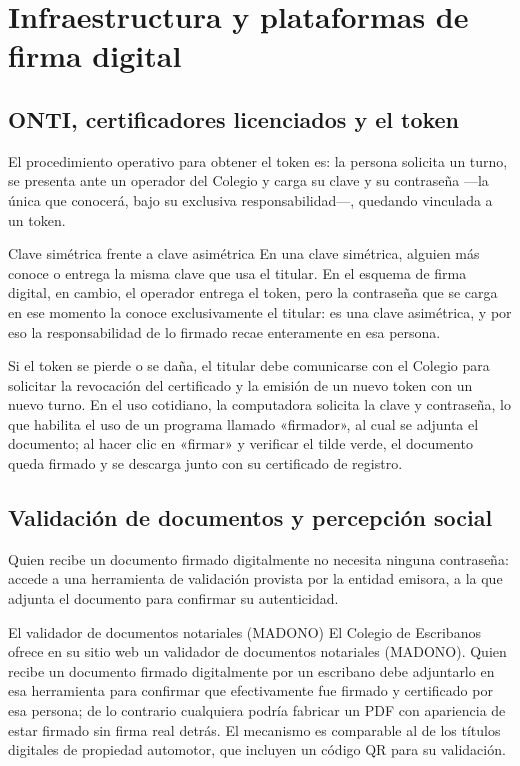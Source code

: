 \documentclass[12pt,oneside]{book}
\begin{document}
\section{Infraestructura y plataformas de firma digital}

\subsection{ONTI, certificadores licenciados y el token}

El procedimiento operativo para obtener el token es: la persona solicita un turno, se presenta ante un operador del Colegio y carga su clave y su contraseña ---la única que conocerá, bajo su exclusiva responsabilidad---, quedando vinculada a un token.

\begin{example}{Clave simétrica frente a clave asimétrica}
En una clave simétrica, alguien más conoce o entrega la misma clave que usa el titular. En el esquema de firma digital, en cambio, el operador entrega el token, pero la contraseña que se carga en ese momento la conoce exclusivamente el titular: es una clave asimétrica, y por eso la responsabilidad de lo firmado recae enteramente en esa persona.
\end{example}

Si el token se pierde o se daña, el titular debe comunicarse con el Colegio para solicitar la revocación del certificado y la emisión de un nuevo token con un nuevo turno. En el uso cotidiano, la computadora solicita la clave y contraseña, lo que habilita el uso de un programa llamado «firmador», al cual se adjunta el documento; al hacer clic en «firmar» y verificar el tilde verde, el documento queda firmado y se descarga junto con su certificado de registro.

\subsection{Validación de documentos y percepción social}

Quien recibe un documento firmado digitalmente no necesita ninguna contraseña: accede a una herramienta de validación provista por la entidad emisora, a la que adjunta el documento para confirmar su autenticidad.

\begin{example}{El validador de documentos notariales (MADONO)}
El Colegio de Escribanos ofrece en su sitio web un validador de documentos notariales (MADONO). Quien recibe un documento firmado digitalmente por un escribano debe adjuntarlo en esa herramienta para confirmar que efectivamente fue firmado y certificado por esa persona; de lo contrario cualquiera podría fabricar un PDF con apariencia de estar firmado sin firma real detrás. El mecanismo es comparable al de los títulos digitales de propiedad automotor, que incluyen un código QR para su validación.
\end{example}
\end{document}

